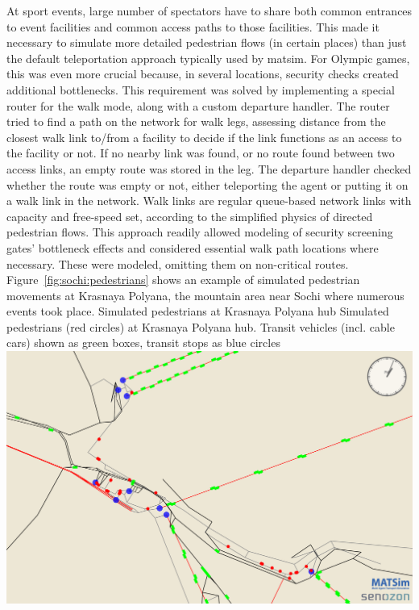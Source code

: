 At sport events, large number of spectators have to share both common entrances
to event facilities and common access paths to those facilities. This
made it necessary to simulate more detailed pedestrian flows (in certain places) 
than just the default \gls{teleportation} approach typically used by
\gls{matsim}. For Olympic games, this was even more crucial because,
in several locations, security checks created additional
bottlenecks. This requirement was solved by implementing a special router for
the walk mode, along with a custom departure handler. The router tried to find a
path on the network for walk legs, assessing distance from the closest walk
link to/from a facility to decide if the link functions as an access to the
facility or not. If no nearby link was found, or no route found between
two access links, an empty route was stored in the leg. The departure handler
checked whether the route was empty or not, either teleporting the agent or putting it
on a walk link in the network. Walk links are regular queue-based network links
with capacity and free-speed set, according to the simplified physics of
directed pedestrian flows. This approach readily allowed modeling of security
screening gates' bottleneck effects and considered essential
walk path locations where necessary. These were modeled, omitting them
on non-critical routes. Figure~\ref{fig:sochi:pedestrians}
shows an example of simulated pedestrian movements at Krasnaya Polyana, the
mountain area near Sochi where numerous events took place.  
%
\createfigure%
{Simulated pedestrians at Krasnaya Polyana hub}%
{Simulated pedestrians (red circles) at Krasnaya Polyana hub. Transit vehicles
(incl. cable cars) shown as green boxes, transit stops as blue circles}%
{\label{fig:sochi:pedestrians}}%
{\includegraphics[width=1.\textwidth,angle=0]{./scenarios/figures/sochi_pedestrians.pdf}}%
{}
%

